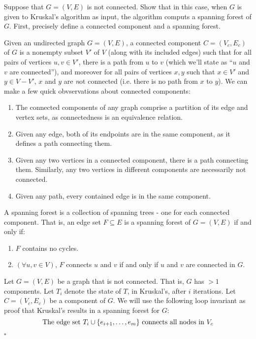 \documentclass{article}
\newenvironment{prb}[1]
	{\renewcommand\theinner{#1}\inner}
	{\endinner}
\newenvironment{solution}
	{\noindent{\bf Solution:}}{\hfill$\square$}
\begin{document}
\begin{prb}{2.9}
Suppose that $G=(V,E)$ is not connected. Show that in this case, when
$G$ is given to Kruskal's algorithm as input, the algorithm computs a
spanning forest of $G$. First, precisely define a connected component
and a spanning forest.
\end{prb}

\begin{solution}
Given an undirected graph $G=(V,E)$, a connected component $C=(V_c,E_c)$
of $G$ is a nonempty subset $V'$ of $V$ (along with its included edges) 
such that for all pairs of vertices $u,v\in V'$, there is a path
from $u$ to $v$ (which we'll state as ``$u$ and $v$ are connected''),
and moreover for all pairs of vertices $x,y$ such that $x\in V'$ and
$y\in V-V'$, $x$ and $y$ are {\emph not} connected (i.e. there is no
path from $x$ to $y$).
We can make a few quick obvservations about connected components:
\begin{enumerate}[label=(\roman*)]
	\item The connected components of any graph comprise a partition of
		its edge and vertex sets, as connectedness is an equivalence relation.
	\item Given any edge, both of its endpoints are in the same component,
		as it defines a path connecting them.
	\item Given any two vertices in a connected component, there is a path
		connecting them. Similarly, any two vertices in different components
		are necessarily not connected.
	\item Given any path, every contained edge is in the same component.
\end{enumerate}

A spanning forest is a collection of spanning trees - one for each
connected component. That is, an edge set $F\subseteq E$ is a spanning
forest of $G=(V,E)$ if and only if:
\begin{enumerate}[label=(\roman*)]
	\item $F$ contains no cycles.
	\item $(\forall u,v\in V)$, $F$ connects $u$ and $v$ if and only if
		$u$ and $v$ are connected in $G$.
\end{enumerate}

Let $G=(V,E)$ be a graph that is not connected. That is, $G$ has $>1$ 
components. Let $T_i$ denote the state of $T$, in Kruskal's, after $i$
iterations. Let $C=(V_c,E_c)$ be a component of $G$.
We will use the following loop invariant as proof
that Kruskal's results in a spanning forest for $G$:
\begin{equation}\label{eq1}
\textit{\emph{The edge set $T_i\cup\{e_{i+1},\ldots,e_m\}$ connects all
nodes in $V_c$}}
\end{equation}


\end{solution}
\end{document}
